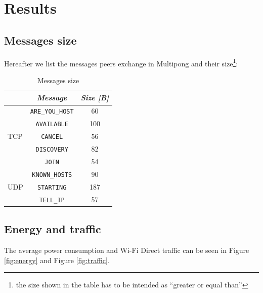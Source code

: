\section{Results}

\subsection{Messages size}

Hereafter we list the messages peers exchange in Multipong and their
size\footnote{the size shown in the table has to be intended as ``greater or
equal than''}:

\begin{table}[H]
  \centering
  \begin{tabular}{l|c c}
  & \textbf{\textit{Message}} & \textbf{\textit{Size [B]}}  \tabularnewline
            \hline
            \multirow{5}{*}{TCP} & \multicolumn{1}{c}{\texttt{ARE\_YOU\_HOST}} & \multicolumn{1}{c}{60} \\\cline{2-3}
                                 & \multicolumn{1}{c}{\texttt{AVAILABLE}} & \multicolumn{1}{c}{100} \\\cline{2-3}
                                 & \multicolumn{1}{c}{\texttt{CANCEL}} & \multicolumn{1}{c}{56} \\\cline{2-3}
                                 & \multicolumn{1}{c}{\texttt{DISCOVERY}} & \multicolumn{1}{c}{82} \\\cline{2-3}
                                 & \multicolumn{1}{c}{\texttt{JOIN}} & \multicolumn{1}{c}{54} \\\hline
            \multirow{3}{*}{UDP} & \multicolumn{1}{c}{\texttt{KNOWN\_HOSTS}} & \multicolumn{1}{c}{90} \\\cline{2-3}
                                 & \multicolumn{1}{c}{\texttt{STARTING}} & \multicolumn{1}{c}{187} \\\cline{2-3}
                                 & \multicolumn{1}{c}{\texttt{TELL\_IP}} & \multicolumn{1}{c}{57} \\\hline
        \end{tabular}
  \caption{Messages size}
  \label{tab:sizes}
\end{table}

\subsection{Energy and traffic}

The average power consumption and Wi-Fi Direct traffic can be seen in Figure
\ref{fig:energy} and Figure \ref{fig:traffic}.

